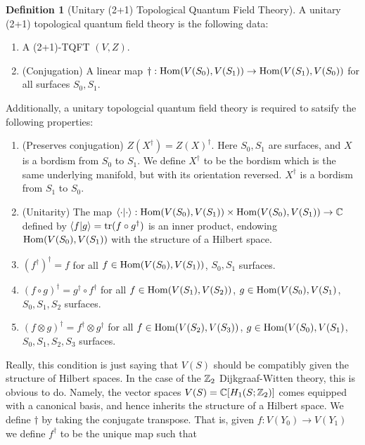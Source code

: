 \documentclass{article}
\theoremstyle{definition}
\newtheorem*{definition}{Definition}
\numberwithin{figure}{section}
\begin{document}
\begin{definition}[Unitary (2+1) Topological Quantum Field Theory] A unitary (2+1) topological quantum field theory is the following data:

\begin{enumerate}
\item A (2+1)-TQFT $(V,Z)$.
\item (Conjugation) A linear map $\dagger: \mathrm{Hom}(V(S_0),V(S_1))\to \mathrm{Hom}(V(S_1),V(S_0))$ for all surfaces $S_0,S_1$.
\end{enumerate}

Additionally, a unitary topologcial quantum field theory is required to satsify the following properties:

\begin{enumerate}

\item (Preserves conjugation) $Z\left(X^{\dagger}\right)=Z(X)^{\dagger}$. Here $S_0,S_1$ are surfaces, and $X$ is a bordism from $S_0$ to $S_1$. We define $X^{\dagger}$ to be the bordism which is the same underlying manifold, but with its orientation reversed. $X^{\dagger}$ is a bordism from $S_1$ to $S_0$.

\item (Unitarity) The map $\left<\cdot|\cdot \right>: \mathrm{Hom}(V(S_0),V(S_1))\times \mathrm{Hom}(V(S_0),V(S_1))\to \mathbb{C}$  defined by $\left<f|g\right>=\mathrm{tr}(f\circ g^\dagger)$ is an inner product, endowing $\mathrm{Hom}(V(S_0),V(S_1))$ with the structure of a Hilbert space.

\item $(f^{\dagger})^{\dagger}=f$ for all $f\in \mathrm{Hom}(V(S_0),V(S_1))$, $S_0,S_1$ surfaces.

\item $(f\circ g)^{\dagger}=g^{\dagger}\circ f^{\dagger}$ for all $f\in \mathrm{Hom}(V(S_1),V(S_2))$, $g\in \mathrm{Hom}(V(S_0),V(S_1)$, $S_0,S_1,S_2$ surfaces.

\item $(f\otimes g)^{\dagger}=f^{\dagger}\otimes g^{\dagger}$ for all $f\in \mathrm{Hom}(V(S_2),V(S_3))$, $g\in \mathrm{Hom}(V(S_0),V(S_1)$, $S_0,S_1,S_2,S_3$ surfaces.
\end{enumerate}
\raggedleft\qedsymbol{}
\end{definition}

Really, this condition is just saying that $V(S)$ should be compatibly given the structure of Hilbert spaces. In the case of the $\mathbb{Z}_2$ Dijkgraaf-Witten theory, this is obvious to do. Namely, the vector spaces $V(S)=\mathbb{C}[H_1(S;\mathbb{Z}_2)]$ comes equipped with a canonical basis, and hence inherits the structure of a Hilbert space. We define $\dagger$ by taking the conjugate transpose. That is, given $f: V(Y_0)\to V(Y_1)$ we define $f^{\dagger}$ to be the unique map such that
\end{document}
